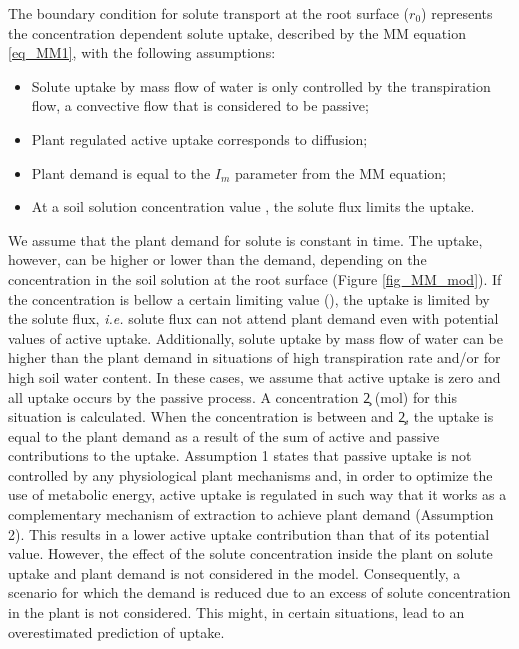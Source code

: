 The boundary condition for solute transport at the root surface ($r_0$) represents the concentration dependent solute uptake, described by the MM equation \ref{eq_MM1}, with the following assumptions:
\begin{itemize}
\item  Solute uptake by mass flow of water is only controlled by the transpiration flow, a convective flow that is considered to be passive;
\item  Plant regulated active uptake corresponds to diffusion;
\item  Plant demand is equal to the $I_m$ parameter from the MM equation;
\item  At a soil solution concentration value \clim, the solute flux limits the uptake. 
\end{itemize}

We assume that the plant demand for solute is constant in time.
The uptake, however, can be higher or lower than the demand, depending on the concentration in the soil solution at the root surface (Figure \ref{fig_MM_mod}). 
If the concentration is bellow a certain limiting value (\clim), the uptake is limited by the solute flux, {\it i.e.} solute flux can not attend plant demand even with potential values of active uptake.
Additionally, solute uptake by mass flow of water can be higher than the plant demand in situations of high transpiration rate and/or for high soil water content. 
In these cases, we assume that active uptake is zero and all uptake occurs by the passive process. A concentration \c2 (mol) for this situation is calculated.
When the concentration is between \clim{} and \c2, the uptake is equal to the plant demand as a result of the sum of active and passive contributions to the uptake.
Assumption 1 states that passive uptake is not controlled by any physiological plant mechanisms and, in order to optimize the use of metabolic energy, active uptake is regulated in such way that it works as a complementary mechanism of extraction to achieve plant demand (Assumption 2).
This results in a lower active uptake contribution than that of its potential value.
However, the effect of the solute concentration inside the plant on solute uptake and plant demand is not considered in the model.
Consequently, a scenario for which the demand is reduced due to an excess of solute concentration in the plant is not considered.
This might, in certain situations, lead to an overestimated prediction of uptake.

